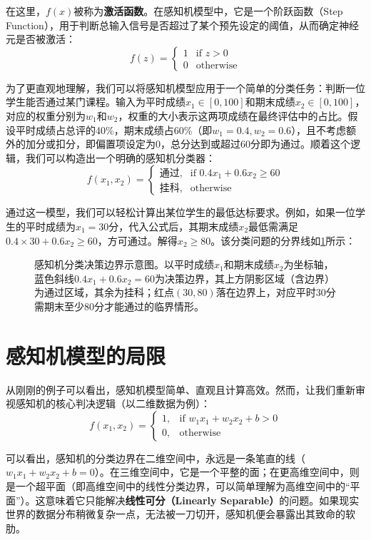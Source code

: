 在这里，$f(x)$被称为\textbf{激活函数}。在感知机模型中，它是一个阶跃函数（Step Function），用于判断总输入信号是否超过了某个预先设定的阈值，从而确定神经元是否被激活：
$$
f(z)=\begin{cases}
    1 & \text{if }z>0 \\
    0 & \text{otherwise}
\end{cases}
$$

为了更直观地理解，我们可以将感知机模型应用于一个简单的分类任务：判断一位学生能否通过某门课程。输入为平时成绩$x_{1}\in[0,100]$和期末成绩$x_{2}\in[0,100]$，对应的权重分别为$w_{1}$和$w_{2}$，权重的大小表示这两项成绩在最终评估中的占比。假设平时成绩占总评的40\%，期末成绩占60\%（即$w_{1}=0.4,w_2=0.6$），且不考虑额外的加分或扣分，即偏置项设定为$0$，总分达到或超过60分即为通过。顺着这个逻辑，我们可以构造出一个明确的感知机分类器：
$$
f(x_1,x_2)=\begin{cases}
    \text{通过}, &\text{if }0.4x_1+0.6x_2\ge60\\
    \text{挂科},&\text{otherwise}
\end{cases}
$$

通过这一模型，我们可以轻松计算出某位学生的最低达标要求。例如，如果一位学生的平时成绩为$x_{1}=30$分，代入公式后，其期末成绩$x_2$最低需满足$0.4\times30+0.6x_2\ge60$，方可通过。解得$x_2\ge80$。该分类问题的分界线如\cref{fig:perceptron_boundary}所示：

\begin{figure}[H]
    \caption{感知机分类决策边界示意图。以平时成绩$x_1$和期末成绩$x_2$为坐标轴，蓝色斜线$0.4x_1+0.6x_2=60$为决策边界，其上方阴影区域（含边界）为通过区域，其余为挂科；红点$(30,80)$落在边界上，对应平时30分需期末至少80分才能通过的临界情形。}
    \label{fig:perceptron_boundary}
\end{figure}

\section{感知机模型的局限}

从刚刚的例子可以看出，感知机模型简单、直观且计算高效。然而，让我们重新审视感知机的核心判决逻辑（以二维数据为例）：
$$
f(x_1, x_2) = \begin{cases}
    1, & \text{if } w_1x_1 + w_2x_2 + b > 0 \\
    0, & \text{otherwise}
\end{cases}
$$

可以看出，感知机的分类边界在二维空间中，永远是一条笔直的线（$w_{1}x_{1}+w_{2}x_{2}+b=0$）。在三维空间中，它是一个平整的面；在更高维空间中，则是一个超平面（即高维空间中的线性分类边界，可以简单理解为高维空间中的“平面”）。这意味着它只能解决\textbf{线性可分（Linearly Separable）}的问题。如果现实世界的数据分布稍微复杂一点，无法被一刀切开，感知机便会暴露出其致命的软肋。

